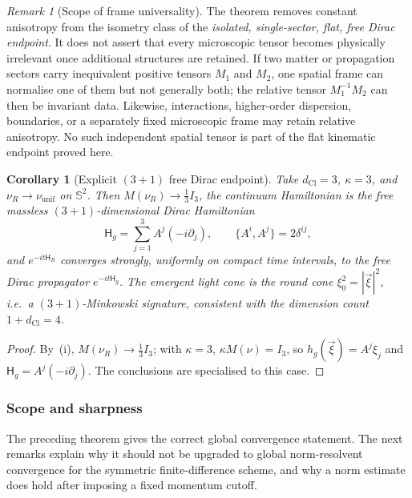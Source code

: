 \documentclass[11pt]{article}
\newtheorem{corollary}[theorem]{Corollary}
\theoremstyle{definition}
\theoremstyle{remark}
\newtheorem{remark}[theorem]{Remark}
\newcommand{\dCl}{d_{\mathrm{Cl}}}
\newcommand{\Sphere}{\mathbb{S}}
\newcommand{\Ham}{\mathsf{H}}
\begin{document}
\begin{remark}[Scope of frame universality]
\label{rem:frame-universality-scope}
The theorem removes constant anisotropy from the isometry class of the
\emph{isolated, single-sector, flat, free Dirac endpoint}.  It does not assert
that every microscopic tensor becomes physically irrelevant once additional
structures are retained.  If two matter or propagation sectors carry
inequivalent positive tensors \(M_1\) and \(M_2\), one spatial frame can
normalise one of them but not generally both; the relative tensor
\(M_1^{-1}M_2\) can then be invariant data.  Likewise, interactions,
higher-order dispersion, boundaries, or a separately fixed microscopic frame
may retain relative anisotropy.  No such independent spatial tensor is part of
the flat kinematic endpoint proved here.
\end{remark}

\begin{corollary}[Explicit $(3+1)$ free Dirac endpoint]
\label{cor:31-endpoint}
Take $\dCl=3$, $\kappa=3$, and $\nu_R\to\nu_{\mathrm{unif}}$ on $\Sphere^{2}$.  Then
$M(\nu_R)\to\tfrac13 I_3$, the continuum Hamiltonian is the free massless
$(3+1)$-dimensional Dirac Hamiltonian
\[
  \Ham_g=\sum_{j=1}^{3}A^j(-i\partial_j),\qquad \{A^i,A^j\}=2\delta^{ij},
\]
and $e^{-it\Ham_R}$ converges strongly, uniformly on compact time intervals, to
the free Dirac propagator $e^{-it\Ham_g}$.  The emergent light cone is the round
cone $\xi_0^2=|\vec\xi|^2$, i.e.\ a $(3+1)$-Minkowski signature, consistent with the dimension count $1+\dCl=4$.
\end{corollary}

\begin{proof}
By \,(i), $M(\nu_R)\to\tfrac13 I_3$; with $\kappa=3$,
$\kappa M(\nu)=I_3$, so $h_g(\vec\xi)=A^j\xi_j$ and $\Ham_g=A^j(-i\partial_j)$.
The conclusions are  specialised to this case.
\end{proof}

\subsubsection{Scope and sharpness}

The preceding theorem gives the correct global convergence statement.  The next
remarks explain why it should not be upgraded to global norm-resolvent
convergence for the symmetric finite-difference scheme, and why a norm estimate
does hold after imposing a fixed momentum cutoff.
\end{document}
